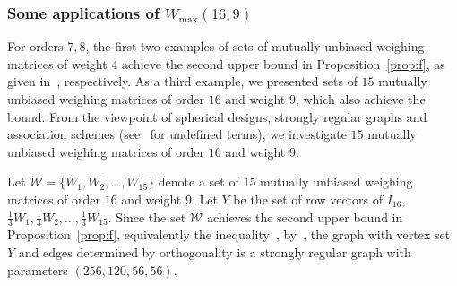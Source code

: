 \documentclass[12pt]{article}
\theoremstyle{remark}
\begin{document}
\subsubsection{Some applications of  $W_{\max}(16,9)$}

For orders $7,8$,
the first two examples of sets of mutually unbiased weighing matrices of
weight $4$ achieve the second upper bound in Proposition~\ref{prop:f}, 
as given in~\cite[Theorems~21, 22]{BKR}, respectively.
As a third
example, we presented sets of $15$ mutually unbiased weighing matrices of
order $16$ and weight $9$, which also achieve the bound.
From the viewpoint of spherical designs, strongly regular graphs and association schemes
(see~\cite{S} for undefined terms), 
we investigate $15$ mutually unbiased weighing matrices of order $16$ and weight $9$. 

Let $\mathcal{W}=\{W_1,W_2,\ldots,W_{15}\}$
denote a set of $15$ mutually unbiased weighing matrices of order $16$ and weight $9$. 
Let $Y$ be the set of row vectors of 
$I_{16}$, $\frac{1}{3}W_{1},\frac{1}{3}W_{2},\ldots, \frac{1}{3}W_{15}$. 
Since the set $\mathcal{W}$
achieves the second upper bound in Proposition~\ref{prop:f}, 
equivalently the inequality~\cite[(3.9)]{CCKS}, by~\cite[Proposition~3.12]{CCKS}, 
the graph with vertex set $Y$ and edges determined by orthogonality is a strongly regular graph with parameters $(256,120,56,56)$.   
\end{document}
